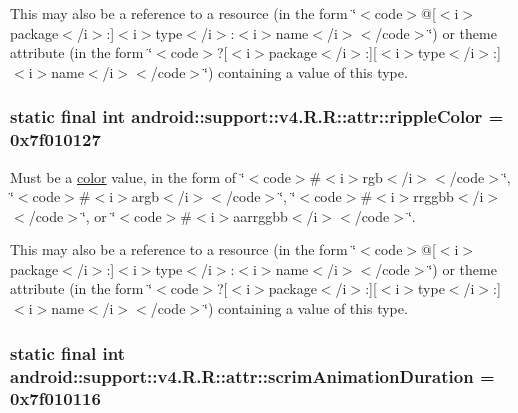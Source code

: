 This may also be a reference to a resource (in the form \char`\"{}$<$code$>$@\mbox{[}$<$i$>$package$<$/i$>$:\mbox{]}$<$i$>$type$<$/i$>$:$<$i$>$name$<$/i$>$$<$/code$>$\char`\"{}) or theme attribute (in the form \char`\"{}$<$code$>$?\mbox{[}$<$i$>$package$<$/i$>$:\mbox{]}\mbox{[}$<$i$>$type$<$/i$>$:\mbox{]}$<$i$>$name$<$/i$>$$<$/code$>$\char`\"{}) containing a value of this type. \hypertarget{classandroid_1_1support_1_1v4_1_1_r_1_1attr_008191cd3ac318fc96837e516c666129}{
\subsubsection[{rippleColor}]{\setlength{\rightskip}{0pt plus 5cm}static final int android::support::v4.R.R::attr::rippleColor = 0x7f010127}}
\label{classandroid_1_1support_1_1v4_1_1_r_1_1attr_008191cd3ac318fc96837e516c666129}


Must be a \hyperlink{classandroid_1_1support_1_1v4_1_1_r_1_1color}{color} value, in the form of \char`\"{}$<$code$>$\#$<$i$>$rgb$<$/i$>$$<$/code$>$\char`\"{}, \char`\"{}$<$code$>$\#$<$i$>$argb$<$/i$>$$<$/code$>$\char`\"{}, \char`\"{}$<$code$>$\#$<$i$>$rrggbb$<$/i$>$$<$/code$>$\char`\"{}, or \char`\"{}$<$code$>$\#$<$i$>$aarrggbb$<$/i$>$$<$/code$>$\char`\"{}. 

This may also be a reference to a resource (in the form \char`\"{}$<$code$>$@\mbox{[}$<$i$>$package$<$/i$>$:\mbox{]}$<$i$>$type$<$/i$>$:$<$i$>$name$<$/i$>$$<$/code$>$\char`\"{}) or theme attribute (in the form \char`\"{}$<$code$>$?\mbox{[}$<$i$>$package$<$/i$>$:\mbox{]}\mbox{[}$<$i$>$type$<$/i$>$:\mbox{]}$<$i$>$name$<$/i$>$$<$/code$>$\char`\"{}) containing a value of this type. \hypertarget{classandroid_1_1support_1_1v4_1_1_r_1_1attr_5fd60b7720c2aedd7a0db3475e6b12b8}{
\subsubsection[{scrimAnimationDuration}]{\setlength{\rightskip}{0pt plus 5cm}static final int android::support::v4.R.R::attr::scrimAnimationDuration = 0x7f010116}}
\label{classandroid_1_1support_1_1v4_1_1_r_1_1attr_5fd60b7720c2aedd7a0db3475e6b12b8}


